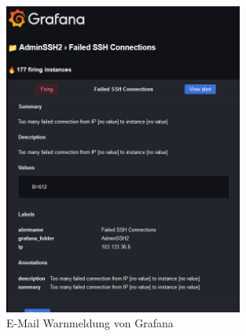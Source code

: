\begin{figure}[H]
  \centering
  \includegraphics[width=0.7\textwidth]{assets/OurAlert.png}
  \caption[E-Mail Warnmeldung von Grafana]
  {E-Mail Warnmeldung von Grafana}
  \centering
\end{figure}





